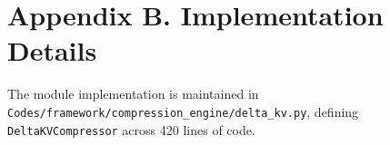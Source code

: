 \section*{Appendix B. Implementation Details}
The module implementation is maintained in \texttt{Codes/framework/compression\_engine/delta\_kv.py}, defining \texttt{DeltaKVCompressor} across 420 lines of code.
